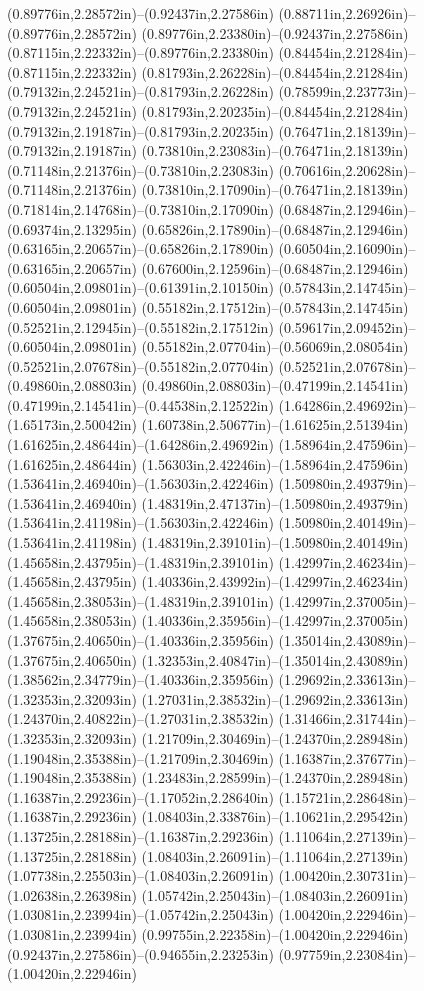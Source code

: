 (0.89776in,2.28572in)--(0.92437in,2.27586in) (0.88711in,2.26926in)--(0.89776in,2.28572in) (0.89776in,2.23380in)--(0.92437in,2.27586in) (0.87115in,2.22332in)--(0.89776in,2.23380in) (0.84454in,2.21284in)--(0.87115in,2.22332in) (0.81793in,2.26228in)--(0.84454in,2.21284in) (0.79132in,2.24521in)--(0.81793in,2.26228in) (0.78599in,2.23773in)--(0.79132in,2.24521in) (0.81793in,2.20235in)--(0.84454in,2.21284in) (0.79132in,2.19187in)--(0.81793in,2.20235in) (0.76471in,2.18139in)--(0.79132in,2.19187in) (0.73810in,2.23083in)--(0.76471in,2.18139in) (0.71148in,2.21376in)--(0.73810in,2.23083in) (0.70616in,2.20628in)--(0.71148in,2.21376in) (0.73810in,2.17090in)--(0.76471in,2.18139in) (0.71814in,2.14768in)--(0.73810in,2.17090in) (0.68487in,2.12946in)--(0.69374in,2.13295in) (0.65826in,2.17890in)--(0.68487in,2.12946in) (0.63165in,2.20657in)--(0.65826in,2.17890in) (0.60504in,2.16090in)--(0.63165in,2.20657in) (0.67600in,2.12596in)--(0.68487in,2.12946in) (0.60504in,2.09801in)--(0.61391in,2.10150in) (0.57843in,2.14745in)--(0.60504in,2.09801in) (0.55182in,2.17512in)--(0.57843in,2.14745in) (0.52521in,2.12945in)--(0.55182in,2.17512in) (0.59617in,2.09452in)--(0.60504in,2.09801in) (0.55182in,2.07704in)--(0.56069in,2.08054in) (0.52521in,2.07678in)--(0.55182in,2.07704in) (0.52521in,2.07678in)--(0.49860in,2.08803in) (0.49860in,2.08803in)--(0.47199in,2.14541in) (0.47199in,2.14541in)--(0.44538in,2.12522in) (1.64286in,2.49692in)--(1.65173in,2.50042in) (1.60738in,2.50677in)--(1.61625in,2.51394in) (1.61625in,2.48644in)--(1.64286in,2.49692in) (1.58964in,2.47596in)--(1.61625in,2.48644in) (1.56303in,2.42246in)--(1.58964in,2.47596in) (1.53641in,2.46940in)--(1.56303in,2.42246in) (1.50980in,2.49379in)--(1.53641in,2.46940in) (1.48319in,2.47137in)--(1.50980in,2.49379in) (1.53641in,2.41198in)--(1.56303in,2.42246in) (1.50980in,2.40149in)--(1.53641in,2.41198in) (1.48319in,2.39101in)--(1.50980in,2.40149in) (1.45658in,2.43795in)--(1.48319in,2.39101in) (1.42997in,2.46234in)--(1.45658in,2.43795in) (1.40336in,2.43992in)--(1.42997in,2.46234in) (1.45658in,2.38053in)--(1.48319in,2.39101in) (1.42997in,2.37005in)--(1.45658in,2.38053in) (1.40336in,2.35956in)--(1.42997in,2.37005in) (1.37675in,2.40650in)--(1.40336in,2.35956in) (1.35014in,2.43089in)--(1.37675in,2.40650in) (1.32353in,2.40847in)--(1.35014in,2.43089in) (1.38562in,2.34779in)--(1.40336in,2.35956in) (1.29692in,2.33613in)--(1.32353in,2.32093in) (1.27031in,2.38532in)--(1.29692in,2.33613in) (1.24370in,2.40822in)--(1.27031in,2.38532in) (1.31466in,2.31744in)--(1.32353in,2.32093in) (1.21709in,2.30469in)--(1.24370in,2.28948in) (1.19048in,2.35388in)--(1.21709in,2.30469in) (1.16387in,2.37677in)--(1.19048in,2.35388in) (1.23483in,2.28599in)--(1.24370in,2.28948in) (1.16387in,2.29236in)--(1.17052in,2.28640in) (1.15721in,2.28648in)--(1.16387in,2.29236in) (1.08403in,2.33876in)--(1.10621in,2.29542in) (1.13725in,2.28188in)--(1.16387in,2.29236in) (1.11064in,2.27139in)--(1.13725in,2.28188in) (1.08403in,2.26091in)--(1.11064in,2.27139in) (1.07738in,2.25503in)--(1.08403in,2.26091in) (1.00420in,2.30731in)--(1.02638in,2.26398in) (1.05742in,2.25043in)--(1.08403in,2.26091in) (1.03081in,2.23994in)--(1.05742in,2.25043in) (1.00420in,2.22946in)--(1.03081in,2.23994in) (0.99755in,2.22358in)--(1.00420in,2.22946in) (0.92437in,2.27586in)--(0.94655in,2.23253in) (0.97759in,2.23084in)--(1.00420in,2.22946in) 
